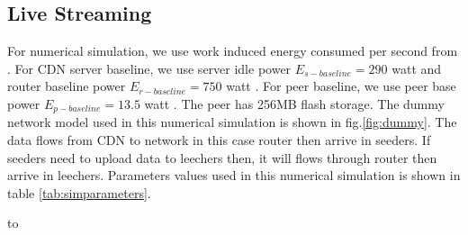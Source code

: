 \documentclass[JIP]{ipsj}
\begin{document}
\subsection{Live Streaming}
For numerical simulation, we use work induced energy consumed per second from \cite{Nedevschi:2008:HDC:1855610.1855618}.
For CDN server baseline, we use server idle power $E_{s-baseline}=290$ watt and router baseline power $E_{r-baseline}=750$ watt \cite{Nedevschi:2008:HDC:1855610.1855618}. 
For peer baseline, we use peer base power $E_{p-baseline}=13.5$ watt \cite{valancius2009greening}.
The peer has 256MB flash storage.
The dummy network model used in this numerical simulation is shown in fig.\ref{fig:dummy}.
The data flows from CDN to network in this case router then arrive in seeders. 
If seeders need to upload data to leechers then, it will flows through router then arrive in leechers. 
Parameters values used in this numerical simulation is shown in table \ref{tab:simparameters}.
\begin{table}[thb]
\caption{Numerical Simulation Parameters.}
\label{tab:simparameters}
\hbox to
\end{table}
\end{document}
